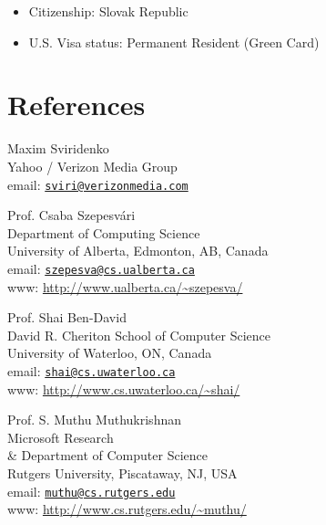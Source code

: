 \documentclass[9pt]{article}
\begin{document}
\begin{itemize}
\item Citizenship: Slovak Republic
\item U.S. Visa status: Permanent Resident (Green Card)
\end{itemize}

\section*{References}
%
\begin{minipage}[t]{9cm}
Maxim Sviridenko \\
Yahoo / Verizon Media Group \\
email: \href{mailto:sviri@verizonmedia.com}{\texttt{sviri@verizonmedia.com}} \\
\end{minipage}
%
\begin{minipage}[t]{9cm}
Prof. Csaba Szepesv\'ari \\
Department of Computing Science \\
University of Alberta, Edmonton, AB, Canada \\
email: \href{mailto:szepesva@cs.ualberta.ca}{\texttt{szepesva@cs.ualberta.ca}} \\
www: \url{http://www.ualberta.ca/~szepesva/}
\end{minipage}

\vspace{1cm}

\noindent
\begin{minipage}[t]{9cm}
Prof. Shai Ben-David \\
David R. Cheriton School of Computer Science \\
University of Waterloo, ON, Canada \\
email: \href{mailto:shai@cs.uwaterloo.ca}{\texttt{shai@cs.uwaterloo.ca}} \\
www: \url{http://www.cs.uwaterloo.ca/~shai/}
\end{minipage}
%
\begin{minipage}[t]{9cm}
Prof. S. Muthu Muthukrishnan \\
Microsoft Research \\
\& Department of Computer Science \\
Rutgers University, Piscataway, NJ, USA \\
email: \href{mailto:muthu@cs.rutgers.edu}{\texttt{muthu@cs.rutgers.edu}} \\
www: \url{http://www.cs.rutgers.edu/~muthu/}
\end{minipage}

\renewcommand{\refname}{Publications}
\nocite{*}


\end{document}
